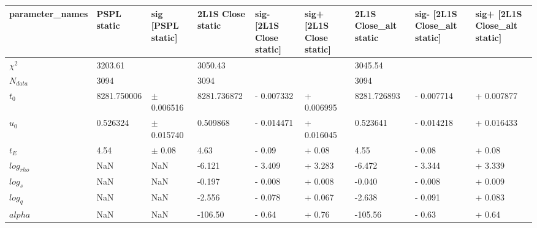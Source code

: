 \begin{tabular}{lllllllll}
\toprule
parameter_names & PSPL static & sig [PSPL static] & 2L1S Close static & sig- [2L1S Close static] & sig+ [2L1S Close static] & 2L1S Close_alt static & sig- [2L1S Close_alt static] & sig+ [2L1S Close_alt static] \\
\midrule
       $\chi^2$ &     3203.61 &                   &           3050.43 &                          &                          &               3045.54 &                              &                              \\
     $N_{data}$ &        3094 &                   &              3094 &                          &                          &                  3094 &                              &                              \\
        $t_{0}$ & 8281.750006 &    $\pm$ 0.006516 &       8281.736872 &               - 0.007332 &               + 0.006995 &           8281.726893 &                   - 0.007714 &                   + 0.007877 \\
        $u_{0}$ &    0.526324 &    $\pm$ 0.015740 &          0.509868 &               - 0.014471 &               + 0.016045 &              0.523641 &                   - 0.014218 &                   + 0.016433 \\
        $t_{E}$ &        4.54 &        $\pm$ 0.08 &              4.63 &                   - 0.09 &                   + 0.08 &                  4.55 &                       - 0.08 &                       + 0.08 \\
    $log_{rho}$ &         NaN &               NaN &            -6.121 &                  - 3.409 &                  + 3.283 &                -6.472 &                      - 3.344 &                      + 3.339 \\
      $log_{s}$ &         NaN &               NaN &            -0.197 &                  - 0.008 &                  + 0.008 &                -0.040 &                      - 0.008 &                      + 0.009 \\
      $log_{q}$ &         NaN &               NaN &            -2.556 &                  - 0.078 &                  + 0.067 &                -2.638 &                      - 0.091 &                      + 0.083 \\
        $alpha$ &         NaN &               NaN &           -106.50 &                   - 0.64 &                   + 0.76 &               -105.56 &                       - 0.63 &                       + 0.64 \\

\end{tabular}
